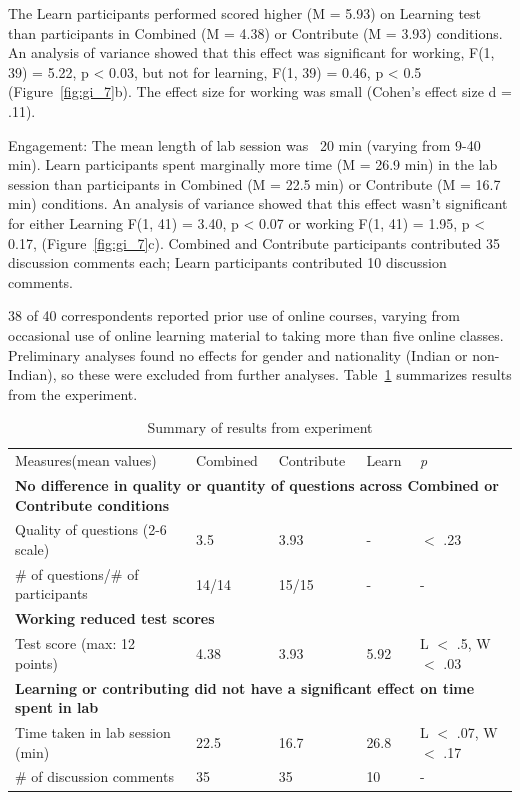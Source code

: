 The Learn participants performed scored higher (M = 5.93) on Learning test than participants in Combined (M = 4.38) or Contribute (M = 3.93) conditions. An analysis of variance showed that this effect was significant for working, F(1, 39) = 5.22, p < 0.03, but not for learning, F(1, 39) = 0.46, p < 0.5 (Figure~\ref{fig:gi_7}b). The effect size for working was small (Cohen’s effect size d = .11).

Engagement: The mean length of lab session was ~20 min (varying from 9-40 min). Learn participants spent marginally more time (M = 26.9 min) in the lab session than participants in Combined (M = 22.5 min) or Contribute (M = 16.7 min) conditions. An analysis of variance showed that this effect wasn’t significant for either Learning F(1, 41) = 3.40, p < 0.07 or working F(1, 41) = 1.95, p < 0.17, (Figure~\ref{fig:gi_7}c). Combined and Contribute participants contributed 35 discussion comments each; Learn participants contributed 10 discussion comments.

38 of 40 correspondents reported prior use of online courses, varying from occasional use of online learning material to taking more than five online classes. Preliminary analyses found no effects for gender and nationality (Indian or non-Indian), so these were excluded from further analyses. Table~\ref{tab:gi-results1} summarizes results from the experiment. 

\vspace{0.25in}
\begin{table}[!ht]
\caption[Summary of results from experiment]{Summary of results from experiment}

\vspace{-0.25in}
\begin{center}
\renewcommand{\arraystretch}{1.5} %
\begin{tabular}{|p{1in}|p{1in}|p{1in}|p{1in}|p{1in}|}
\hline
Measures(mean values)	& Combined &	Contribute	& Learn	& {\it p} \\
\multicolumn{5}{|l|}{\bf No difference in quality or quantity of questions across Combined or Contribute conditions}   \\
Quality of questions (2-6 scale)  &	3.5 &	3.93	&-	& $<$ .23\\
\# of questions/\# of participants &	14/14 &	15/15 &	- &	-\\
\multicolumn{2}{|l|}{\bf  Working reduced test scores}  & & & \\
Test score (max: 12 points) & 4.38	& 3.93 & 5.92 & L $<$ .5, W $<$ .03 \\
\multicolumn{5}{|l|}{\bf Learning or contributing did not have a significant effect on time spent in lab }   \\
Time taken in lab session (min) & 22.5 & 16.7 & 26.8 & L $<$ .07, W $<$ .17\\
\# of discussion comments & 35 & 35 & 10 & - \\
\hline
\end{tabular}
\end{center}
\label{tab:gi-results1}
\end{table}

